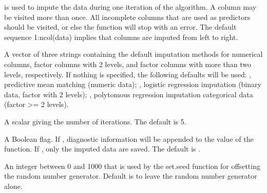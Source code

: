 \documentclass{article}
\begin{document}
\begin{Arguments}
\begin{ldescription}
is used to impute the data during one iteration of the algorithm. A
column may be visited more than once. All incomplete columns that are
used as predictors should be visited, or else the function will stop
with an error. The default sequence 1:ncol(data) implies that columns
are imputed from left to right.
\item[\code{defaultImputationMethod}] A vector of three strings containing the default imputation methods for numerical columns, factor 
columns with 2 levels, and factor columns with more than two levels, respectively. If nothing is 
specified, the following defaults will be used:
, predictive mean matching (numeric data);
, logistic regression imputation (binary data, factor with 2 levels);
, polytomous regression imputation categorical data (factor >= 2 levels).
\item[\code{maxit}] A scalar giving the number of iterations. The default is 5.
\item[\code{diagnostics}] A Boolean flag. If , diagnostic
information will be appended to the value of the function. If
, only the imputed data are saved. The default is .
\item[\code{printFlag}] 
\item[\code{seed}] An integer between 0 and 1000 that is used by the
set.seed function for offsetting the random number generator. Default is to leave the random number generator alone.
\end{ldescription}
\end{Arguments}
\end{document}
